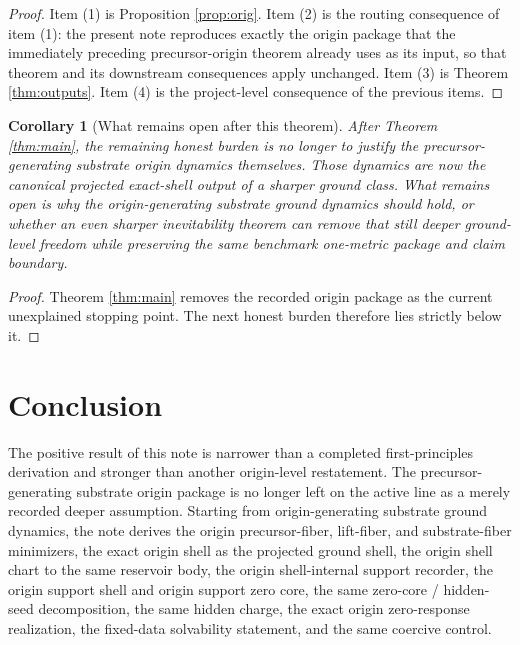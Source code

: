 \documentclass[11pt]{article}
\newtheorem{corollary}{Corollary}
\begin{document}
\begin{proof}
Item (1) is Proposition \ref{prop:orig}. Item (2) is the routing consequence of item (1): the present note reproduces exactly the origin package that the immediately preceding precursor-origin theorem already uses as its input, so that theorem and its downstream consequences apply unchanged. Item (3) is Theorem \ref{thm:outputs}. Item (4) is the project-level consequence of the previous items.
\end{proof}

\begin{corollary}[What remains open after this theorem]
\label{cor:next}
After Theorem \ref{thm:main}, the remaining honest burden is no longer to justify the precursor-generating substrate origin dynamics themselves. Those dynamics are now the canonical projected exact-shell output of a sharper ground class. What remains open is why the origin-generating substrate ground dynamics should hold, or whether an even sharper inevitability theorem can remove that still deeper ground-level freedom while preserving the same benchmark one-metric package and claim boundary.
\end{corollary}

\begin{proof}
Theorem \ref{thm:main} removes the recorded origin package as the current unexplained stopping point. The next honest burden therefore lies strictly below it.
\end{proof}

\section{Conclusion}

The positive result of this note is narrower than a completed first-principles derivation and stronger than another origin-level restatement. The precursor-generating substrate origin package is no longer left on the active line as a merely recorded deeper assumption. Starting from origin-generating substrate ground dynamics, the note derives the origin precursor-fiber, lift-fiber, and substrate-fiber minimizers, the exact origin shell as the projected ground shell, the origin shell chart to the same reservoir body, the origin shell-internal support recorder, the origin support shell and origin support zero core, the same zero-core / hidden-seed decomposition, the same hidden charge, the exact origin zero-response realization, the fixed-data solvability statement, and the same coercive control.
\end{document}
